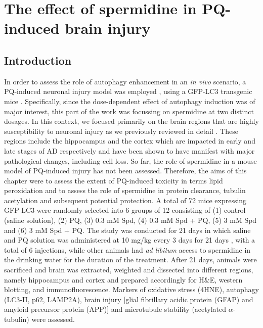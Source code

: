 \chapter{The effect of spermidine in PQ-induced brain injury}
\label{sec:chapter7}
\section{Introduction}
In order to assess the role of autophagy enhancement in an \textit{in vivo} scenario, a PQ-induced neuronal injury model was employed \citep{Chen2012}, using a GFP-LC3 transgenic mice \citep{Mizushima2004a}. Specifically, since the dose-dependent effect of autophagy induction was of major interest, this part of the work was focussing on spermidine at two distinct dosages. In this context, we focused primarily on the brain regions that are highly susceptibility to neuronal injury as we previously reviewed in detail \citep{lumkwana2017}. These regions include the hippocampus and the cortex which are impacted in early and late stages of AD respectively and have been shown to have manifest with major pathological changes, including cell loss. So far, the role of spermidine in a mouse model of PQ-induced injury has not been assessed. Therefore, the aims of this chapter were to assess the extent of PQ-induced toxicity in terms lipid peroxidation and to assess the role of spermidine in protein clearance, tubulin acetylation and subsequent potential protection. A total of 72 mice expressing GFP-LC3 were randomly selected into 6 groups of 12 consisting of (1) control (saline solution), (2) PQ, (3) 0.3 mM Spd, (4) 0.3 mM Spd + PQ, (5) 3 mM Spd and (6) 3 mM Spd + PQ. The study was conducted for 21 days in which saline and PQ solution was administered at 10 mg/kg every 3 days for 21 days \citep{Chen2012}, with a total of 6 injections, while other animals had \textit{ad libitum} access to spermidine in the drinking water for the duration of the treatment. After 21 days, animals were sacrificed and brain was extracted, weighted and dissected into different regions, namely hippocampus and cortex and prepared accordingly for H\&E, western blotting, and immunofluorescence. Markers of oxidative stress (4HNE), autophagy (LC3-II, p62, LAMP2A), brain injury [glial fibrillary acidic protein (GFAP) and amyloid precursor protein (APP)] and microtubule stability (acetylated $\alpha$-tubulin) were assessed. 

